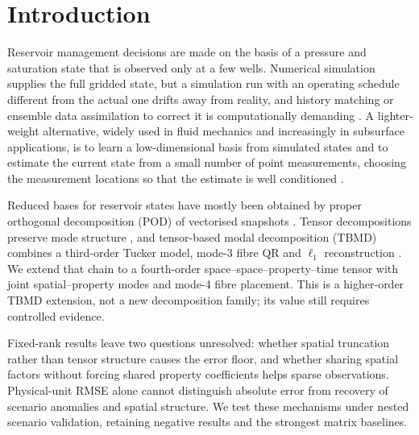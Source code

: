 \section{Introduction}
\label{sec:intro}
Reservoir management decisions are made on the basis of a pressure and saturation state that is observed only at a few wells. Numerical simulation supplies the full gridded state, but a simulation run with an operating schedule different from the actual one drifts away from reality, and history matching or ensemble data assimilation to correct it is computationally demanding \cite{oliver2008,evensen2009,jansen2011}. A lighter-weight alternative, widely used in fluid mechanics and increasingly in subsurface applications, is to learn a low-dimensional basis from simulated states and to estimate the current state from a small number of point measurements, choosing the measurement locations so that the estimate is well conditioned \cite{everson1995,willcox2006,manohar2018}.

Reduced bases for reservoir states have mostly been obtained by proper orthogonal decomposition (POD) of vectorised snapshots \cite{vandoren2006,cardoso2010,he2014,jansen2017rom}. Tensor decompositions preserve mode structure \cite{kolda2009,delathauwer2000}, and tensor-based modal decomposition (TBMD) combines a third-order Tucker model, mode-3 fibre QR and $\ell_1$ reconstruction \cite{zhong2024tbmd}. We extend that chain to a fourth-order space--space--property--time tensor with joint spatial--property modes and mode-4 fibre placement. This is a higher-order TBMD extension, not a new decomposition family; its value still requires controlled evidence.

Fixed-rank results leave two questions unresolved: whether spatial truncation rather than tensor structure causes the error floor, and whether sharing spatial factors without forcing shared property coefficients helps sparse observations. Physical-unit RMSE alone cannot distinguish absolute error from recovery of scenario anomalies and spatial structure. We test these mechanisms under nested scenario validation, retaining negative results and the strongest matrix baselines.

